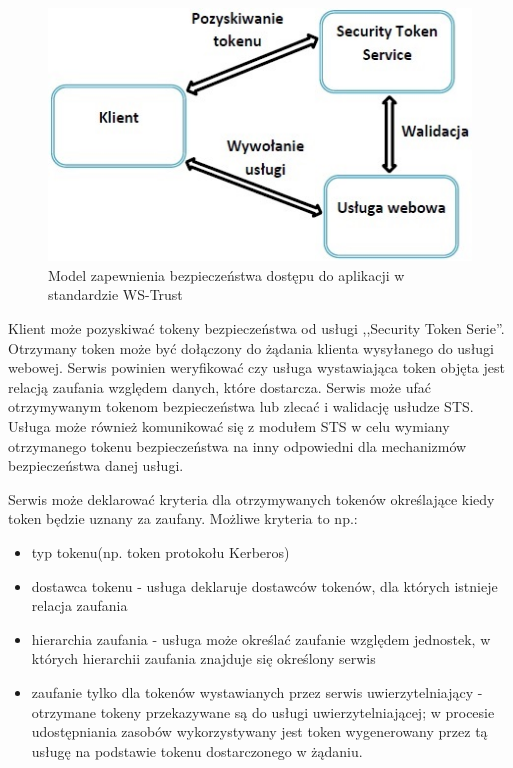 		\begin{figure}[h]
			\centering
				\includegraphics{img/ws-trust.jpg}
			\caption{Model zapewnienia bezpieczeństwa dostępu do aplikacji w standardzie WS-Trust}
			\label{Model zapewnienia bezpieczeństwa dostępu do aplikacji w standardzie WS-Trust}
		\end{figure}

		Klient może pozyskiwać tokeny bezpieczeństwa od usługi ,,Security Token Serie''. Otrzymany token może być dołączony do żądania klienta wysyłanego do usługi webowej. Serwis powinien weryfikować czy usługa wystawiająca token objęta jest relacją zaufania względem danych, które dostarcza. Serwis może ufać otrzymywanym tokenom bezpieczeństwa lub zlecać i walidację usłudze STS. Usługa może również komunikować się z modułem STS w celu wymiany otrzymanego tokenu bezpieczeństwa na inny odpowiedni dla mechanizmów bezpieczeństwa danej usługi. 

		Serwis może deklarować kryteria dla otrzymywanych tokenów określające kiedy token będzie uznany za zaufany\cite{WS-Trust-1.4-with-errata}. Możliwe kryteria to np.:

		\begin{itemize}
			\item typ tokenu(np. token protokołu Kerberos)
			\item dostawca tokenu - usługa deklaruje dostawców tokenów, dla których istnieje relacja zaufania
			\item hierarchia zaufania - usługa może określać zaufanie względem jednostek, w których hierarchii zaufania znajduje się określony serwis
			\item zaufanie tylko dla tokenów wystawianych przez serwis uwierzytelniający - otrzymane tokeny przekazywane są do usługi uwierzytelniającej; w procesie udostępniania zasobów wykorzystywany jest token wygenerowany przez tą usługę na podstawie tokenu dostarczonego w żądaniu. 
		\end{itemize} 
		
